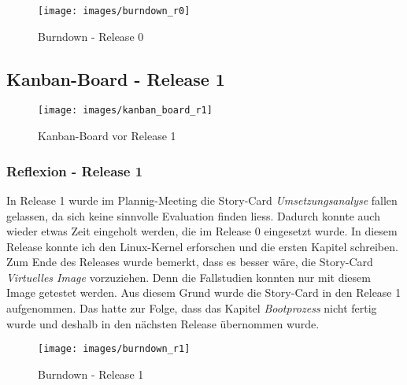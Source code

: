\begin{figure}[h!]
   \begin{center}
      \texttt{[image: images/burndown\_r0]}
   \end{center}
   \caption{Burndown - Release 0}
\end{figure}



\begin{landscape}

\subsection{Kanban-Board - Release 1}

\begin{figure}[h!]
	\begin{center}
		\texttt{[image: images/kanban\_board\_r1]}
	\end{center}
   \caption[Kanban-Board - Release 1]{Kanban-Board vor Release 1}
   \label{fig:kanban_r1}
\end{figure}

\end{landscape}
\restoregeometry

\subsubsection{Reflexion - Release 1}

In Release 1 wurde im Plannig-Meeting die Story-Card \emph{Umsetzungsanalyse} fallen gelassen, da sich keine sinnvolle Evaluation finden liess. Dadurch konnte auch wieder
etwas Zeit eingeholt werden, die im Release 0 eingesetzt wurde. In diesem Release konnte ich den Linux-Kernel erforschen und die ersten Kapitel schreiben.
Zum Ende des Releases wurde bemerkt, dass es besser wäre, die Story-Card \emph{Virtuelles Image} vorzuziehen. Denn die Fallstudien konnten nur mit diesem Image getestet werden.
Aus diesem Grund wurde die Story-Card in den Release 1 aufgenommen. Das hatte zur Folge, dass das Kapitel \emph{Bootprozess} nicht fertig wurde und deshalb in den nächsten
Release übernommen wurde. \\

\begin{figure}[h!]
   \begin{center}
      \texttt{[image: images/burndown\_r1]}
   \end{center}
   \caption{Burndown - Release 1}
\end{figure}


